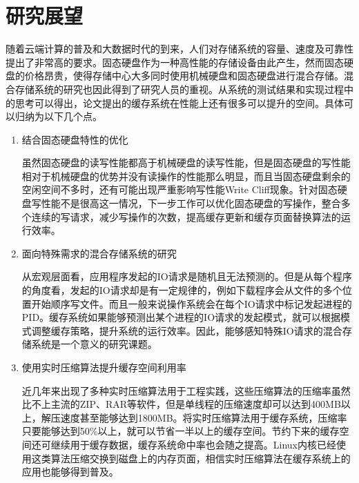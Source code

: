 \section{研究展望}
\label{sec:thesis_expectation}
随着云端计算的普及和大数据时代的到来，人们对存储系统的容量、速度及可靠性提出了非常高的要求。固态硬盘作为一种高性能的存储设备由此产生，然而固态硬盘的价格昂贵，使得存储中心大多同时使用机械硬盘和固态硬盘进行混合存储。混合存储系统的研究也因此得到了研究人员的重视。从系统的测试结果和实现过程中的思考可以得出，论文提出的缓存系统在性能上还有很多可以提升的空间。具体可以归纳为以下几个点。

\begin{enumerate}
\item 结合固态硬盘特性的优化

虽然固态硬盘的读写性能都高于机械硬盘的读写性能，但是固态硬盘的写性能相对于机械硬盘的优势并没有读操作的性能那么明显，而且当固态硬盘剩余的空闲空间不多时，还有可能出现严重影响写性能Write Cliff现象。针对固态硬盘写性能不是很高这一情况，下一步工作可以优化固态硬盘的写操作，整合多个连续的写请求，减少写操作的次数，提高缓存更新和缓存页面替换算法的运行效率。

\item 面向特殊需求的混合存储系统的研究

从宏观层面看，应用程序发起的IO请求是随机且无法预测的。但是从每个程序的角度看，发起的IO请求却是有一定规律的，例如下载程序会从文件的多个位置开始顺序写文件。而且一般来说操作系统会在每个IO请求中标记发起进程的PID。缓存系统如果能够预测出某个进程的IO请求的发起模式，就可以根据模式调整缓存策略，提升系统的运行效率。因此，能够感知特殊IO请求的混合存储系统是一个意义的研究课题。

\item 使用实时压缩算法提升缓存空间利用率

近几年来出现了多种实时压缩算法用于工程实践，这些压缩算法的压缩率虽然比不上主流的ZIP、RAR等软件，但是单线程的压缩速度却可以达到400MB以上，解压速度甚至能够达到1800MB。将实时压缩算法用于缓存系统，压缩率只要能够达到50\%以上，就可以节省一半以上的缓存空间。节约下来的缓存空间还可继续用于缓存数据，缓存系统命中率也会随之提高。Linux内核已经使用这类算法压缩交换到磁盘上的内存页面，相信实时压缩算法在缓存系统上的应用也能够得到普及。

\end{enumerate}
